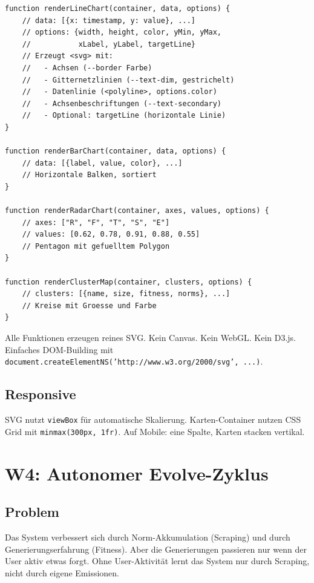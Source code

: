 \documentclass[11pt,a4paper]{article}
\begin{document}
\begin{lstlisting}[style=bash]
function renderLineChart(container, data, options) {
    // data: [{x: timestamp, y: value}, ...]
    // options: {width, height, color, yMin, yMax, 
    //           xLabel, yLabel, targetLine}
    // Erzeugt <svg> mit:
    //   - Achsen (--border Farbe)
    //   - Gitternetzlinien (--text-dim, gestrichelt)
    //   - Datenlinie (<polyline>, options.color)
    //   - Achsenbeschriftungen (--text-secondary)
    //   - Optional: targetLine (horizontale Linie)
}

function renderBarChart(container, data, options) {
    // data: [{label, value, color}, ...]
    // Horizontale Balken, sortiert
}

function renderRadarChart(container, axes, values, options) {
    // axes: ["R", "F", "T", "S", "E"]
    // values: [0.62, 0.78, 0.91, 0.88, 0.55]
    // Pentagon mit gefuelltem Polygon
}

function renderClusterMap(container, clusters, options) {
    // clusters: [{name, size, fitness, norms}, ...]
    // Kreise mit Groesse und Farbe
}
\end{lstlisting}

Alle Funktionen erzeugen reines SVG. Kein Canvas. Kein 
WebGL. Kein D3.js. Einfaches DOM-Building mit 
\texttt{document.createElementNS('http://www.w3.org/2000/svg', 
...)}.

\subsection{Responsive}

SVG nutzt \texttt{viewBox} f\"ur automatische Skalierung. 
Karten-Container nutzen CSS Grid mit \texttt{minmax(300px, 1fr)}. 
Auf Mobile: eine Spalte, Karten stacken vertikal.


\section{W4: Autonomer Evolve-Zyklus}
\label{sec:w4}

\subsection{Problem}

Das System verbessert sich durch Norm-Akkumulation (Scraping) 
und durch Generierungserfahrung (Fitness). Aber die 
Generierungen passieren nur wenn der User aktiv etwas forgt. 
Ohne User-Aktivit\"at lernt das System nur durch Scraping, 
nicht durch eigene Emissionen.
\end{document}
